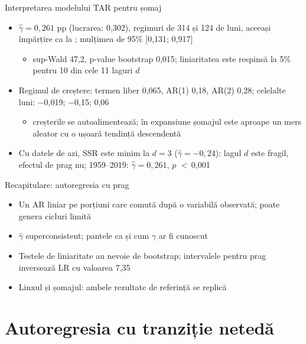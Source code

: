 \begin{frame}{Interpretarea modelului TAR pentru șomaj}
\itemsize{\footnotesize}
\begin{itemize}
    \item $\hat\gamma = 0{,}261$ pp (lucrarea: 0,302), regimuri de 314 și 124 de luni, aceeași împărțire ca la ; mulțimea de 95\% [0{,}131; 0{,}917]
    \begin{itemize}
        \item sup-Wald 47{,}2, p-value bootstrap 0{,}015; liniaritatea este respinsă la 5\% pentru 10 din cele 11 laguri $d$
    \end{itemize}
    \item Regimul de creștere: termen liber 0{,}065, AR(1) 0{,}18, AR(2) 0{,}28; celelalte luni: \ensuremath{-}0{,}019; \ensuremath{-}0{,}15; 0{,}06
    \begin{itemize}
        \item creșterile se autoalimentează; în expansiune șomajul este aproape un mers aleator cu o ușoară tendință descendentă
    \end{itemize}
    \item Cu datele de azi, SSR este minim la $d = 3$ ($\hat\gamma = \ensuremath{-}0{,}24$): lagul $d$ este fragil, efectul de prag nu; 1959--2019: $\hat\gamma = 0{,}261$, $p$ $<$\,0{,}001
\end{itemize}
\end{frame}

\begin{frame}{Recapitulare: autoregresia cu prag}
\itemsize{\small}
\begin{itemize}
    \item Un AR liniar pe porțiuni care comută după o variabilă observată; poate genera cicluri limită
    \item $\hat\gamma$ superconsistent; pantele ca și cum $\gamma$ ar fi cunoscut
    \item Testele de liniaritate au nevoie de bootstrap; intervalele pentru prag inversează LR cu valoarea 7,35
    \item Linxul și șomajul: ambele rezultate de referință se replică
\end{itemize}
\end{frame}


\section{Autoregresia cu tranziție netedă}

